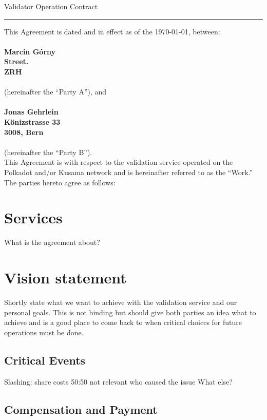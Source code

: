 \documentclass[10pt]{article}
\begin{document}
\begin{center}
{\Large Validator Operation Contract}
\end{center}

\hrule height .1mm

\vspace{.5cm}

\noindent This Agreement is dated and in effect as of the \today, between:\\
\\
{\bf Marcin Górny\\
Street.\\
ZRH\\}
\\
(hereinafter the ``Party A''), and\\
\\
{\bf Jonas Gehrlein\\
Könizstrasse 33\\
3008, Bern\\}
\\
(hereinafter the ``Party B'').  \\

This Agreement is with respect to the
validation service operated on the Polkadot and/or Kusama network and is hereinafter referred to as the
``Work.'' The parties hereto agree as follows: 


\section{Services}

What is the agreement about?


\section{Vision statement}

Shortly state what we want to achieve with the validation service and our personal goals. This is not binding but should give both parties an idea what to achieve and is a good place to come back to when critical choices for future operations must be done.

\subsection{Critical Events}
Slashing: share costs 50:50 not relevant who caused the issue
What else?



\subsection{Compensation and Payment}
\end{document}
